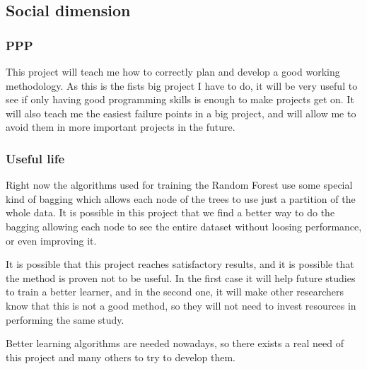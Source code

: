 \documentclass[a4paper]{article}
\begin{document}
        \subsection{Social dimension}
            \subsubsection{PPP}

            This project will teach me how to correctly plan and develop a good working methodology. As this is the fists big project I have to do, it will be very useful to see if only having good programming skills is enough to make projects get on. It will also teach me the easiest failure points in a big project, and will allow me to avoid them in more important projects in the future.

            \subsubsection{Useful life}


            Right now the algorithms used for training the Random Forest use some special kind of bagging which allows each node of the trees to use just a partition of the whole data. It is possible in this project that we find a better way to do the bagging allowing each node to see the entire dataset without loosing performance, or even improving it.

            It is possible that this project reaches satisfactory results, and it is possible that the method is proven not to be useful. In the first case it will help future studies to train a better learner, and in the second one, it will make other researchers know that this is not a good method, so they will not need to invest resources in performing the same study.

            Better learning algorithms are needed nowadays, so there exists a real need of this project and many others to try to develop them.
\end{document}
